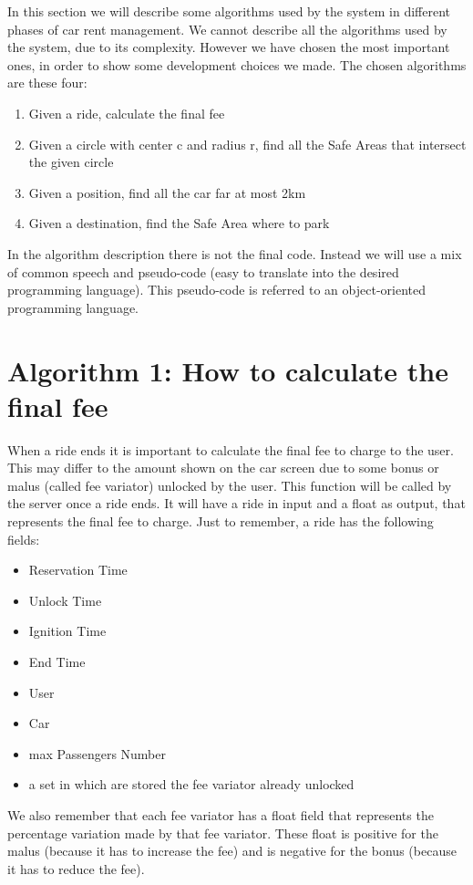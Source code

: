 In this section we will describe some algorithms used by the system in different phases of car rent management. We cannot describe all the algorithms used by the system, due to its complexity. However we have chosen the most important ones, in order to show some development choices we made.
The chosen algorithms are these four:
\begin{enumerate}
\item Given a ride, calculate the final fee
\item Given a circle with center c and radius r, find all the Safe Areas that intersect the given circle
\item Given a position, find all the car far at most 2km
\item Given a destination, find the Safe Area where to park
\end{enumerate}
In the algorithm description there is not the final code. Instead we will use a mix of common speech and pseudo-code (easy to translate into the desired programming language). This pseudo-code is referred to an object-oriented programming language.

\section{Algorithm 1: How to calculate the final fee}
When a ride ends it is important to calculate the final fee to charge to the user. This may differ to the amount shown on the car screen due to some bonus or malus (called fee variator) unlocked by the user.
This function will be called by the server once a ride ends. It will have a ride in input and a float as output, that represents the final fee to charge.
Just to remember, a ride has the following fields:
\begin{itemize}
\item Reservation Time
\item Unlock Time
\item Ignition Time
\item End Time
\item User
\item Car
\item max Passengers Number
\item a set in which are stored the fee variator already unlocked
\end{itemize}

We also remember that each fee variator has a float field that represents the percentage variation made by that fee variator. These float is positive for the malus (because it has to increase the fee) and is negative for the bonus (because it has to reduce the fee).

